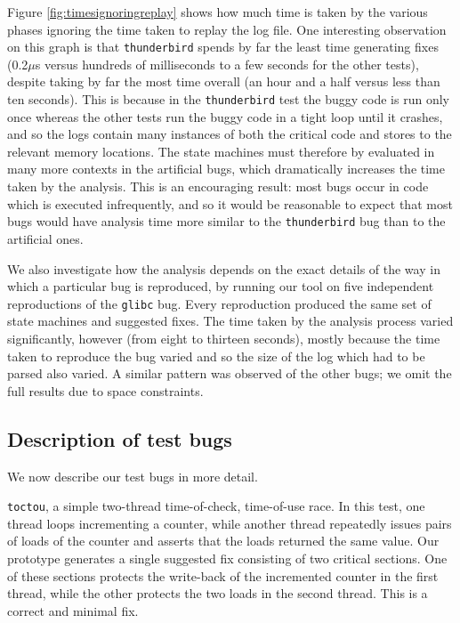 \documentclass[10pt,twocolumn,preprint,natbib,authoryear]{sigplanconf}
\newcommand{\editorial}[1]{}
\begin{document}
Figure \ref{fig:timesignoringreplay} shows how much time is taken by
the various phases ignoring the time taken to replay the log file.
One interesting observation on this graph is that \verb|thunderbird|
spends by far the least time generating fixes (0.2$\mu{}$s versus
hundreds of milliseconds to a few seconds for the other tests),
despite taking by far the most time overall (an hour and a half versus
less than ten seconds).  This is because in the \verb|thunderbird|
test the buggy code is run only once whereas the other tests run the
buggy code in a tight loop until it crashes, and so the logs contain
many instances of both the critical code and stores to the relevant
memory locations.  The state machines must therefore by evaluated in
many more contexts in the artificial bugs, which dramatically
increases the time taken by the analysis.  This is an encouraging
result: most bugs occur in code which is executed infrequently, and so
it would be reasonable to expect that most bugs would have analysis
time more similar to the \verb|thunderbird| bug than to the artificial
ones.

We also investigate how the analysis depends on the exact details of
the way in which a particular bug is reproduced, by running our tool
on five independent reproductions of the \verb|glibc| bug.  Every
reproduction produced the same set of state machines and suggested
fixes.  The time taken by the analysis process varied significantly,
however (from eight to thirteen seconds), mostly because the time
taken to reproduce the bug varied and so the size of the log which had
to be parsed also varied.  A similar pattern was observed of the other
bugs; we omit the full results due to space constraints\editorial{Not
  sure this is all that interesting, or that I've phrased it very
  well...}.

\subsection{Description of test bugs}
\label{sect:bug_descr}

We now describe our test bugs in more detail.

\verb|toctou|, a simple two-thread time-of-check, time-of-use race.
In this test, one thread loops incrementing a counter, while another
thread repeatedly issues pairs of loads of the counter and asserts
that the loads returned the same value.  Our prototype generates a
single suggested fix consisting of two critical sections.  One of
these sections protects the write-back of the incremented counter in
the first thread, while the other protects the two loads in the second
thread.  This is a correct and minimal fix.
\end{document}
